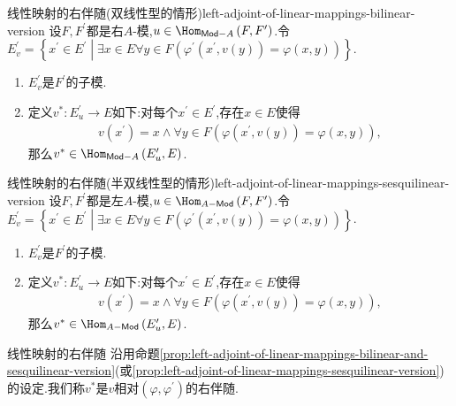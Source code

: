 \begin{proposition}{线性映射的右伴随(双线性型的情形)}{left-adjoint-of-linear-mappings-bilinear-version}
	设$F,F^{\prime}$都是右$A$-模,$u\in\Hom_{\mathsf{Mod}-A}\left(F,F^{\prime}\right)$.令$E_{v}^{\prime}=\left\{x^{\prime}\in E^{\prime}\middle|\exists x\in E\forall y\in F\left(\varphi^{\prime}\left(x^{\prime},v\left(y\right)\right)=\varphi\left(x,y\right)\right)\right\}$.
	\begin{enumerate}
		\item $E_{v}^{\prime}$是$F^{\prime}$的子模.
		\item 定义$v^{\ast}:E_{u}^{\prime}\to E$如下:对每个$x^{\prime}\in E^{\prime}$,存在$x\in E$使得
		\begin{align*}
			v\left(x^{\prime}\right)=x\wedge\forall y\in F\left(\varphi\left(x^{\prime},v\left(y\right)\right)=\varphi\left(x,y\right)\right),
		\end{align*}
		那么$v^{\ast}\in\Hom_{\mathsf{Mod}-A}\left(E_{u}^{\prime},E\right)$.
	\end{enumerate}
\end{proposition}

\begin{proposition}{线性映射的右伴随(半双线性型的情形)}{left-adjoint-of-linear-mappings-sesquilinear-version}
	设$F,F^{\prime}$都是左$A$-模,$u\in\Hom_{A-\mathsf{Mod}}\left(F,F^{\prime}\right)$.令$E_{v}^{\prime}=\left\{x^{\prime}\in E^{\prime}\middle|\exists x\in E\forall y\in F\left(\varphi^{\prime}\left(x^{\prime},v\left(y\right)\right)=\varphi\left(x,y\right)\right)\right\}$.
	\begin{enumerate}
		\item $E_{v}^{\prime}$是$F^{\prime}$的子模.
		\item 定义$v^{\ast}:E_{u}^{\prime}\to E$如下:对每个$x^{\prime}\in E^{\prime}$,存在$x\in E$使得
		\begin{align*}
			v\left(x^{\prime}\right)=x\wedge\forall y\in F\left(\varphi\left(x^{\prime},v\left(y\right)\right)=\varphi\left(x,y\right)\right),
		\end{align*}
		那么$v^{\ast}\in\Hom_{A-\mathsf{Mod}}\left(E_{u}^{\prime},E\right)$.
	\end{enumerate}
\end{proposition}

\begin{definition}{线性映射的右伴随}{}
	沿用命题\ref{prop:left-adjoint-of-linear-mappings-bilinear-and-sesquilinear-version}(或\ref{prop:left-adjoint-of-linear-mappings-sesquilinear-version})的设定.我们称$v^{\ast}$是$v$相对$\left(\varphi,\varphi^{\prime}\right)$的右伴随.
\end{definition}

